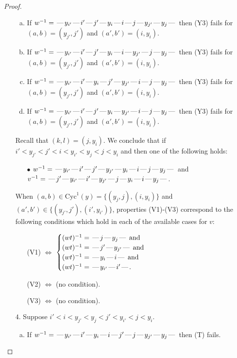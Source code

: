 \documentclass[10pt]{article}
\theoremstyle{definition}
\theoremstyle{definition}
\def\dash{\text{\hspace{0.5mm}---\hspace{0.5mm}}}
\def\Cyc{\mathrm{Cyc}}
\begin{document}
\begin{proof}
\begin{enumerate}
\begin{enumerate}[(a)]
\item If $w^{-1} = \dash y_{i'}\dash i'\dash j'\dash y_i\dash i\dash j\dash y_{j'}\dash y_j\dash $ then (Y3) fails for $(a,b)=(y_{j'},j')$ and $(a',b')=(i,y_i)$.
\item If $w^{-1} = \dash y_{i'}\dash i'\dash j'\dash y_i\dash i\dash y_{j'}\dash j\dash y_j\dash $ then (Y3) fails for $(a,b)=(y_{j'},j')$ and $(a',b')=(i,y_i)$.
\item If $w^{-1} = \dash y_{i'}\dash i'\dash y_i\dash j'\dash y_{j'}\dash i\dash j\dash y_j\dash $ then (Y3) fails for $(a,b)=(y_{j'},j')$ and $(a',b')=(i,y_i)$.
\item If $w^{-1} = \dash y_{i'}\dash i'\dash j'\dash y_i\dash y_{j'}\dash i\dash j\dash y_j\dash $ then (Y3) fails for $(a,b)=(y_{j'},j')$ and $(a',b')=(i,y_i)$.
\end{enumerate}
Recall that $(k,l) = (j,y_i)$.
We conclude that if $i' < y_{j'} < j' < i < y_{i'} < y_j < j < y_i$ and then one of the following holds:
\begin{enumerate}
\item[$\bullet$] $w^{-1} = \dash y_{i'}\dash i'\dash j'\dash y_{j'}\dash y_i\dash i\dash j\dash y_j\dash $ and $v^{-1} = \dash j'\dash y_{i'}\dash i'\dash y_{j'}\dash j\dash y_i\dash i\dash y_j\dash $.
\end{enumerate}
When $(a,b)\in\Cyc^1(y)=\{(y_j,j),(i,y_i)\}$ and $(a',b')\in\{(y_{j'},j'),(i',y_{i'})\}$,
properties (V1)-(V3) correspond to the following conditions which hold in
each of the available cases for $v$:
\begin{enumerate}
\item[](V1) $\Leftrightarrow$ $\begin{cases}\text{$(wt)^{-1} = \dash j \dash y_j \dash$}\text{ and }\\
\text{$(wt)^{-1} = \dash j' \dash y_{j'} \dash$}\text{ and }\\
\text{$(wt)^{-1} = \dash y_i \dash i \dash$}\text{ and }\\
\text{$(wt)^{-1} = \dash y_{i'} \dash i' \dash$}.\end{cases}$
\item[](V2) $\Leftrightarrow$ (no condition).
\item[](V3) $\Leftrightarrow$ (no condition).
\end{enumerate}
\item[$4$.] Suppose $i' < i < y_{j'} < y_j < j' < y_{i'} < j < y_i$.
\begin{enumerate}[(a)]
\item If $w^{-1} = \dash y_{i'}\dash i'\dash y_i\dash i\dash j'\dash j\dash y_{j'}\dash y_j\dash $ then (T) fails.

\end{enumerate}
\end{enumerate}
\end{proof}
\end{document}
